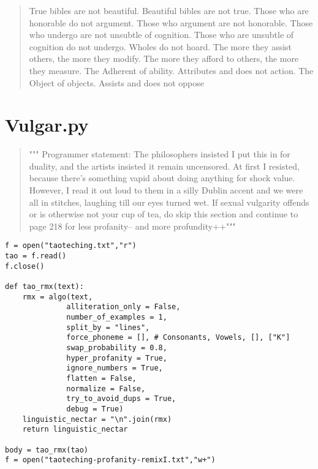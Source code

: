 \documentclass[12pt,a4paper,oneside]{book}
\begin{document}
\begin{verse}
True bibles are not beautiful. Beautiful bibles are not true. Those who are honorable do not argument. Those who argument are not honorable. Those who undergo are not unsubtle of cognition. Those who are unsubtle of cognition do not undergo. Wholes do not hoard. The more they assist others, the more they modify. The more they afford to others, the more they measure. The Adherent of ability. Attributes and does not action. The Object of objects. Assists and does not oppose


\end{verse}

\chapter*{Vulgar.py}

\begin{verse}
""" Programmer statement: The philosophers insisted I put this in for duality, and the artists insisted it remain uncensored. At first I resisted, because there's something vapid about doing anything for shock value. However, I read it out loud to them in a silly Dublin accent and we were all in stitches, laughing till our eyes turned wet. If sexual vulgarity offends or is otherwise not your cup of tea, do skip this section and continue to page 218 for less profanity-- and more profundity++"""
\end{verse}


\begin{verbatim}
f = open("taoteching.txt","r")
tao = f.read()
f.close()

def tao_rmx(text):
    rmx = algo(text,
              alliteration_only = False, 
              number_of_examples = 1, 
              split_by = "lines",
              force_phoneme = [], # Consonants, Vowels, [], ["K"]
              swap_probability = 0.8,
              hyper_profanity = True,
              ignore_numbers = True,
              flatten = False, 
              normalize = False, 
              try_to_avoid_dups = True,
              debug = True)
    linguistic_nectar = "\n".join(rmx)
    return linguistic_nectar

body = tao_rmx(tao)
f = open("taoteching-profanity-remixI.txt","w+")

\end{verbatim}
\newpage
\end{document}
